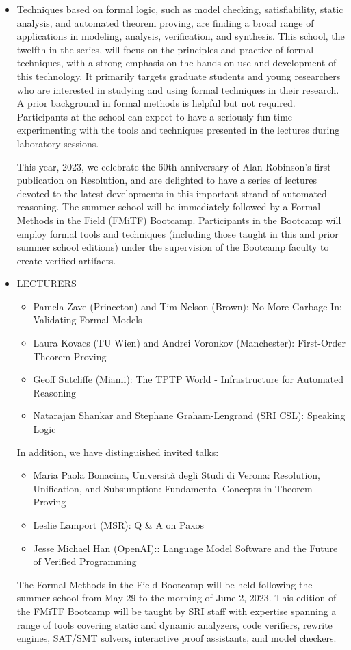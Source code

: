 \documentclass[prodmode,acmtecs]{acmsmall} %
\begin{document}
\begin{itemize}\item  Techniques based on formal logic, such as model checking, satisfiability, static analysis, and automated theorem proving, are finding a broad range of applications in modeling, analysis, verification, and synthesis. This school, the twelfth in the series, will focus on the principles and practice of formal techniques, with a strong emphasis on the hands-on use and development of this technology. It primarily targets graduate students and young researchers who are interested in studying and using formal techniques in their research.  A prior background in formal methods is helpful but not required. Participants at the school can expect to have a seriously fun time experimenting with the tools and techniques presented in the lectures during laboratory sessions.  
 
  This year, 2023, we celebrate the 60th anniversary of Alan Robinson's first publication on Resolution, and are delighted to have a series of lectures devoted to the latest developments in this important strand of automated reasoning.  The summer school will be immediately followed by a Formal Methods in the Field (FMiTF) Bootcamp.  Participants in the Bootcamp will employ formal tools and techniques (including those taught in this and prior summer school editions) under the supervision of the Bootcamp faculty to create verified artifacts. 
 
\item  LECTURERS  
 
\begin{itemize}\item  Pamela Zave (Princeton) and Tim Nelson (Brown): No More Garbage In:  Validating Formal Models 
\item  Laura Kovacs (TU Wien) and Andrei Voronkov (Manchester): First-Order Theorem Proving 
\item  Geoff Sutcliffe (Miami): The TPTP World - Infrastructure for Automated Reasoning 
\item  Natarajan Shankar and Stephane Graham-Lengrand (SRI CSL): Speaking Logic
\end{itemize} 
  In addition, we have distinguished invited talks:  
 
\begin{itemize}\item  Maria Paola Bonacina, Università degli Studi di Verona: Resolution, Unification, and Subsumption: Fundamental Concepts in Theorem Proving 
\item  Leslie Lamport (MSR): Q \& A on Paxos 
\item  Jesse Michael Han (OpenAI):: Language Model Software and the Future of Verified Programming
\end{itemize} 
  The Formal Methods in the Field Bootcamp will be held following the summer school from May 29 to the morning of June 2, 2023.  This edition of the FMiTF Bootcamp will be taught by SRI staff with expertise spanning a range of tools covering static and dynamic analyzers, code verifiers, rewrite engines, SAT/SMT solvers, interactive proof assistants, and model checkers. 
 

\end{itemize}
\end{document}
